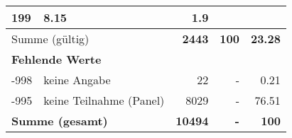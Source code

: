 \begin{longtable}{lXrrr}
       \num{199} &
       \num[round-mode=places,round-precision=2]{8.15} &
         \num[round-mode=places,round-precision=2]{1.9} \\
     \midrule
     \multicolumn{2}{l}{Summe (gültig)} &
       \textbf{\num{2443}} &
     \textbf{\num{100}} &
       \textbf{\num[round-mode=places,round-precision=2]{23.28}} \\
     \multicolumn{5}{l}{\textbf{Fehlende Werte}}\\
       -998 &
       keine Angabe &
         \num{22} &
        - &
         \num[round-mode=places,round-precision=2]{0.21} \\
       -995 &
       keine Teilnahme (Panel) &
         \num{8029} &
        - &
         \num[round-mode=places,round-precision=2]{76.51} \\
     \midrule
     \multicolumn{2}{l}{\textbf{Summe (gesamt)}} &
          \textbf{\num{10494}} &
        \textbf{-} &
        \textbf{\num{100}} \\
     \bottomrule
     \end{longtable}
     
